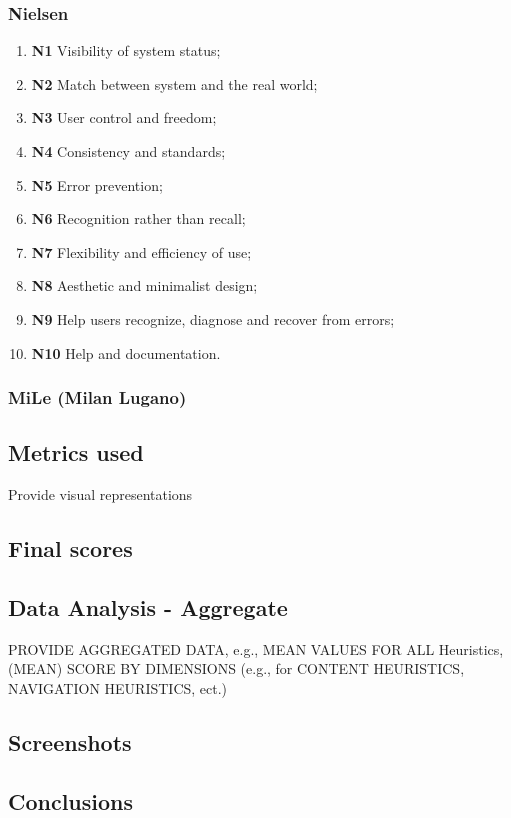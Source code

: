 \subsubsection{Nielsen}
\begin{enumerate}
	\item \textbf{N1} Visibility of system status;
	\item \textbf{N2} Match between system and the real world;
	\item \textbf{N3} User control and freedom;
	\item \textbf{N4} Consistency and standards;
	\item \textbf{N5} Error prevention;
	\item \textbf{N6} Recognition rather than recall;
	\item \textbf{N7} Flexibility and efficiency of use;
	\item \textbf{N8} Aesthetic and minimalist design;
	\item \textbf{N9} Help users recognize, diagnose and recover from errors;
	\item \textbf{N10} Help and documentation.
\end{enumerate}

\subsubsection{MiLe (Milan Lugano)}


\subsection{Metrics used}
Provide visual representations

\subsection{Final scores}

\subsection{Data Analysis - Aggregate}
PROVIDE AGGREGATED DATA, e.g., MEAN VALUES FOR ALL Heuristics,
(MEAN) SCORE BY DIMENSIONS (e.g., for CONTENT HEURISTICS,
NAVIGATION HEURISTICS, ect.)

\subsection{Screenshots}

\subsection{Conclusions}
